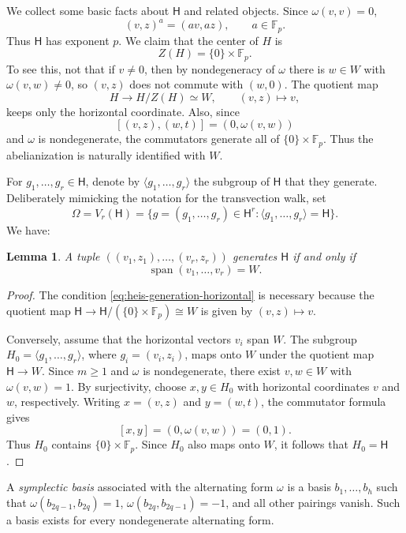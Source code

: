 \documentclass[11pt, reqno]{amsart}
\numberwithin{equation}{section}
\newtheorem{lemma}[theorem]{Lemma}
\newcommand{\Fp}{\mathbb F_p}
\newcommand{\Heis}{\mathsf H}
\newcommand{\Span}{\operatorname{span}}
\begin{document}
We collect some basic facts about $\Heis$ and related objects. Since \(\omega(v,v)=0\),
\begin{equation}\label{eq:heis-powers}
    (v,z)^a=(av,az),\qquad a\in\Fp.
\end{equation}
Thus \(\Heis\) has exponent \(p\). We claim that the center of \(H\) is
\[
    Z(H)=\{0\}\times \Fp.
\]
To see this, not that if \(v\ne0\), then by nondegeneracy of \(\omega\) there is
\(w\in W\) with \(\omega(v,w)\ne0\), so \((v,z)\) does not commute with
\((w,0)\). The quotient map
\[
    H\to H/Z(H)\simeq W,\qquad (v,z)\mapsto v,
\]
keeps only the horizontal coordinate. Also, since
\[
    [(v,z),(w,t)]=(0,\omega(v,w))
\]
and \(\omega\) is nondegenerate, the commutators generate all of
\(\{0\}\times\Fp\). Thus the abelianization is naturally identified with
\(W\).

For \(g_1,\ldots,g_r\in\Heis\), denote by \(\langle g_1,\ldots,g_r\rangle\) the subgroup of \(\Heis\) that they generate. Deliberately mimicking the notation for the transvection walk, set
\[
    \Omega=V_r(\Heis)=\{g=(g_1,\ldots,g_r)\in\Heis^r:
    \langle g_1,\ldots,g_r\rangle=\Heis\}.
\] 
We have:
\begin{lemma}\label{lem:heis-horizontal-generation}
 A tuple \(((v_1,z_1),\ldots,(v_r,z_r))\) generates \(\Heis\)
if and only if
\begin{equation}\label{eq:heis-generation-horizontal}
    \Span(v_1,\ldots,v_r)=W.
\end{equation}
\end{lemma}
\begin{proof}
The condition \eqref{eq:heis-generation-horizontal} is necessary because the
quotient map \(\Heis\to \Heis/(\{0\}\times\Fp)\cong W\) is given by \((v,z)\mapsto v\).

Conversely, assume that the horizontal vectors \(v_i\) span \(W\).
The subgroup \(H_0=\langle g_1,\ldots,g_r\rangle\), where
\(g_i=(v_i,z_i)\), maps onto \(W\) under the quotient map
\(\Heis\to W\). Since \(m\ge1\) and \(\omega\) is nondegenerate, there
exist \(v,w\in W\) with \(\omega(v,w)=1\).  By surjectivity, choose
\(x,y\in H_0\) with horizontal coordinates \(v\) and \(w\), respectively.
Writing \(x=(v,z)\) and \(y=(w,t)\), the commutator formula gives
\[
    [x,y]=(0,\omega(v,w))=(0,1).
\]
Thus \(H_0\) contains \(\{0\}\times\mathbb F_p\).  Since \(H_0\) also maps
onto \(W\), it follows that \(H_0=\Heis\).
\end{proof}

A \emph{symplectic basis} associated with the alternating form $\omega$ is a basis \(b_1,\ldots,b_h\) such that
\(\omega(b_{2q-1},b_{2q})=1\),
\(\omega(b_{2q},b_{2q-1})=-1\), and all other pairings vanish.  Such a basis
exists for every nondegenerate alternating form.  
\end{document}
